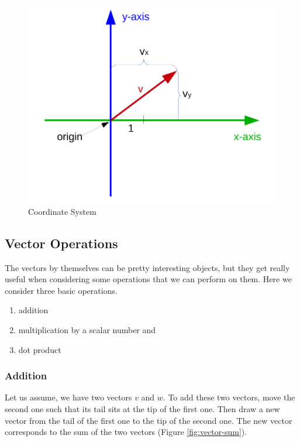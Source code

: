 \documentclass[
]{book}
\providecommand{\tightlist}{%
  \setlength{\itemsep}{0pt}\setlength{\parskip}{0pt}}
\theoremstyle{definition}
\theoremstyle{definition}
\theoremstyle{definition}
\theoremstyle{remark}
\begin{document}
\begin{figure}[!ht]
\includegraphics[width=1\linewidth,]{odg/coordinate-system} \caption{Coordinate System}\label{fig:coordinate-system}
\end{figure}

\hypertarget{intro-linalg-vector-operations}{%
\subsection{Vector Operations}\label{intro-linalg-vector-operations}}

The vectors by themselves can be pretty interesting objects, but they get really useful when considering some operations that we can perform on them. Here we consider three basic operations.

\begin{enumerate}
\def\labelenumi{\arabic{enumi}.}
\tightlist
\item
  addition
\item
  multiplication by a scalar number and
\item
  dot product
\end{enumerate}

\hypertarget{intro-linalg-vector-addition}{%
\subsubsection{Addition}\label{intro-linalg-vector-addition}}

Let us assume, we have two vectors \(v\) and \(w\). To add these two vectors, move the second one such that its tail sits at the tip of the first one. Then draw a new vector from the tail of the first one to the tip of the second one. The new vector corresponds to the sum of the two vectors (Figure \ref{fig:vector-sum}).
\end{document}
